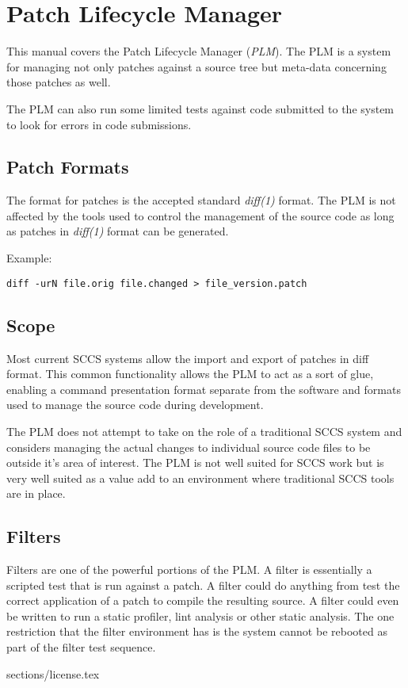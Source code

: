 \section{Patch Lifecycle Manager}
This manual covers the Patch Lifecycle Manager (\emph{PLM}).  The PLM is a system
for managing not only patches against a source tree but meta-data concerning
those patches as well.

The PLM can also run some limited tests against code submitted to the system to 
look for errors in code submissions.

\subsection{Patch Formats}
The format for patches is the accepted standard \emph{diff(1)} format.  The PLM
is not affected by the tools used to control the management of the source code
as long as patches in \emph{diff(1)} format can be generated.

Example:
\begin{verbatim}
diff -urN file.orig file.changed > file_version.patch
\end{verbatim}

\subsection{Scope}
Most current SCCS systems allow the import and export of patches in diff format.
This common functionality allows the PLM to act as a sort of glue, enabling a
command presentation format separate from the software and formats used to manage 
the source code during development.

The PLM does not attempt to take on the role of a traditional SCCS system and 
considers managing the actual changes to individual source code files to be outside
it's area of interest.  The PLM is not well suited for SCCS work but is very well
suited as a value add to an environment where traditional SCCS tools are in place.

\subsection{Filters}
Filters are one of the powerful portions of the PLM.  A filter is essentially a 
scripted test that is run against a patch.  A filter could do anything from 
test the correct application of a patch to compile the resulting source.  A filter
could even be written to run a static profiler, lint analysis or other static analysis.
The one restriction that the filter environment has is the system cannot 
be rebooted as part of the filter test sequence.

 {sections/license.tex}
